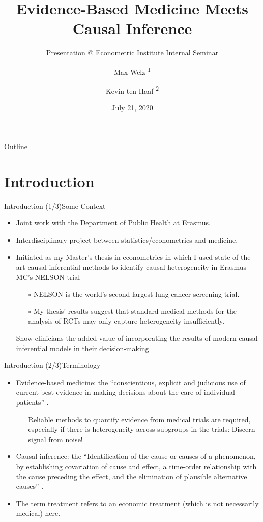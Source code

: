 \documentclass[11pt]{beamer}
\title[EBM Meets Causal Inference]{Evidence-Based Medicine Meets Causal Inference}
\subtitle{Presentation @ Econometric Institute Internal Seminar}
\author[Welz and ten Haaf]{Max Welz \textsuperscript{1} \and Kevin ten Haaf \textsuperscript{2}}
\institute[]{\textsuperscript{1} Erasmus University, Dept. of Econometrics \and \textsuperscript{2} Erasmus MC, Dept. of Public Health}
\date[July 21, 2020]{July 21, 2020}
\begin{document}
\begin{frame}
  \titlepage
\end{frame}

\begin{frame}{Outline}
  \tableofcontents
\end{frame}

\section{Introduction}

\begin{frame}{Introduction (1/3)}{Some Context}
	\begin{itemize}
		\item Joint work with the Department of Public Health at Erasmus.
		\item Interdisciplinary project between statistics/econometrics and medicine.
		\item  Initiated as my Master's thesis in econometrics in which I used state-of-the-art causal inferential methods to identify causal heterogeneity in Erasmus MC's NELSON trial
		\begin{itemize}
			\item[$\circ$] NELSON \citep{dekoning2020} is the world's second largest lung cancer screening trial. 
			\item[$\circ$] My thesis' results suggest that standard medical methods for the analysis of RCTs may only capture heterogeneity insufficiently.
		\end{itemize}
		\item[\ding{212}] Show clinicians the added value of incorporating the results of modern causal inferential models in their decision-making.
		\end{itemize}
\end{frame}


\begin{frame}{Introduction (2/3)}{Terminology}
	\begin{itemize}
		\item \alert{Evidence-based medicine}: the ``conscientious, explicit and judicious use of current best evidence in making decisions about the care of individual patients'' \citep{sackett1996}.
		\begin{itemize}
		\item[\ding{212}] Reliable methods to quantify evidence from medical trials are required, especially if there is heterogeneity across subgroups in the trials: Discern signal from noise! 
		\end{itemize}
		\item \alert{Causal inference}: the ``Identification of the cause or causes of a phenomenon, by establishing covariation of cause and effect, a time-order relationship with the cause preceding the effect, and the elimination of plausible alternative causes'' \citep{shaughnessy2000}.
		\item The term \alert{treatment} refers to an economic treatment (which is not necessarily medical) here. 
	\end{itemize}
\end{frame}
\end{document}

